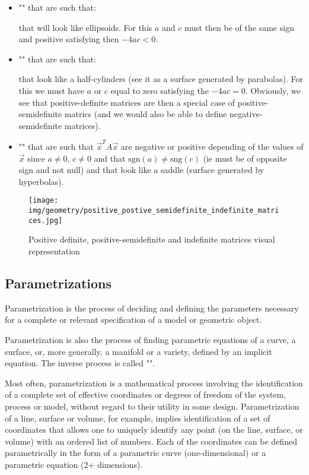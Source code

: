 	\begin{itemize}
		\item "" that are such that:
		
		that will look like ellipsoids. For this $a$ and $c$ must then be of the same sign and positive satisfying then $-4ac<0$.
	
		\item "" that are such that:
		
		that look like a half-cylinders (see it as a surface generated by parabolas). For this we must have $a$ or $c$ equal to zero satisfying the $-4ac=0$. Obviously, we see that positive-definite matrices are then a special case of positive-semidefinite matrics (and we would also be able to define negative-semidefinite matrices).
	
		\item "" that are such that $\vec{x}^TA\vec{x}$ are negative or positive depending of the values of $\vec{x}$ since $a\neq 0$, $c\neq 0$ and that $\mathrm{sgn}(a)\neq\mathrm{sng}(c)$ (ie must be of opposite sign and not null) and that look like a saddle (surface generated by hyperbolas).
	\end{itemize}
	\begin{figure}[H]
		\centering
		\texttt{[image: img/geometry/positive\_postive\_semidefinite\_indefinite\_matrices.jpg]}
		\caption{Positive definite, positive-semidefinite and indefinite matrices visual representation}
	\end{figure}

	\pagebreak
	\subsection{Parametrizations}
	Parametrization  is the process of deciding and defining the parameters necessary for a complete or relevant specification of a model or geometric object.
	
	Parametrization is also the process of finding parametric equations of a curve, a surface, or, more generally, a manifold or a variety, defined by an implicit equation. The inverse process is called "".
	
	Most often, parametrization is a mathematical process involving the identification of a complete set of effective coordinates or degrees of freedom of the system, process or model, without regard to their utility in some design. Parametrization of a line, surface or volume, for example, implies identification of a set of coordinates that allows one to uniquely identify any point (on the line, surface, or volume) with an ordered list of numbers. Each of the coordinates can be defined parametrically in the form of a parametric curve (one-dimensional) or a parametric equation (2+ dimensions).
	
